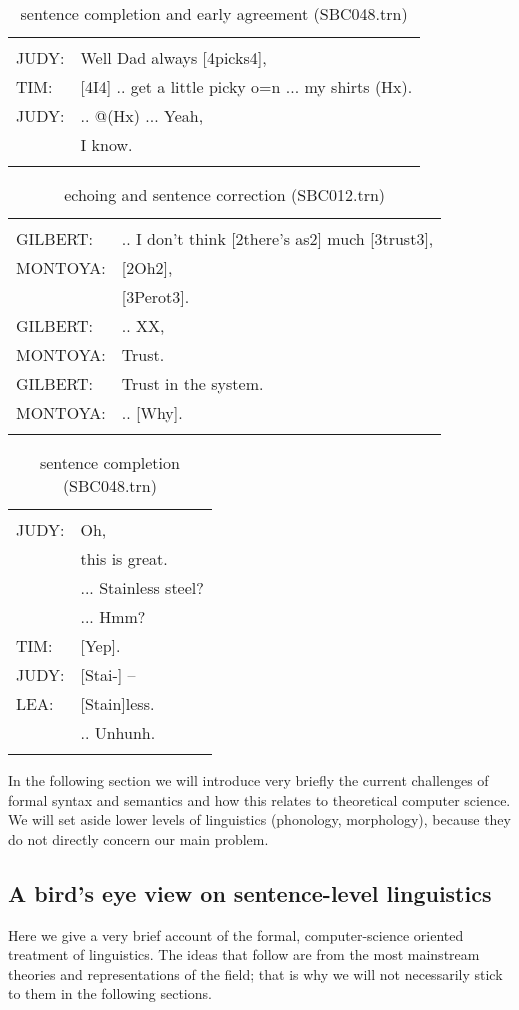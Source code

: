 \documentclass[11pt]{article}
\newenvironment{sbcquote}[2]
{
	\def\savedcaption{\caption{#1}}%
	\def\savedlabel{\label{#2}}%
	\begin{table}[h]
		\centering
		\begin{small}
		\begin{tabular}{ll}
			\hline
			& \\
}
{
	& \\
	\hline
	\end{tabular}
	\end{small}
	\savedcaption
	\savedlabel
\end{table}
}
\begin{document}
				\begin{sbcquote}{sentence completion and early agreement (SBC048.trn)}{tab:dial_sent_compl2}
					JUDY:&	Well Dad always [4picks4],\\
					TIM:&	[4I4] .. get a little picky o=n ... my shirts (Hx).\\
					JUDY:&	.. @(Hx) ... Yeah,\\
					&I know.\\
				\end{sbcquote}
				
				\begin{sbcquote}{echoing and sentence correction (SBC012.trn)}{tab:dial_echoing_corr}
					GILBERT: &.. I don't think [2there's as2] much [3trust3],\\
					MONTOYA:& [2Oh2],\\
					& [3Perot3].\\
					GILBERT:& 	.. XX,\\
					MONTOYA:& 	Trust.\\
					GILBERT:& 	Trust in the system.\\
					MONTOYA:& 	.. [Why].\\
				\end{sbcquote}
				
				\begin{sbcquote}{sentence completion (SBC048.trn)}{tab:dial_sent_compl1}
					JUDY:&	Oh,\\
					&this is great.\\
					&... Stainless steel?\\
					&... Hmm?\\
					TIM:&	[Yep].\\
					JUDY:&	[Stai-] --\\
					LEA:&	[Stain]less.\\
					&.. Unhunh.\\
				\end{sbcquote}
			
			In the following section we will introduce very briefly the current challenges of formal syntax and semantics and how this relates to theoretical computer science. We will set aside lower levels of linguistics (phonology, morphology), because they do not directly concern our main problem.
		\subsection{A bird's eye view on sentence-level linguistics}
			Here we give a very brief account of the formal, computer-science oriented treatment of linguistics. The ideas that follow are from the most mainstream theories and representations of the field; that is why we will not necessarily stick to them in the following sections.
\end{document}
